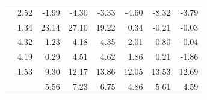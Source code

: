 \begin{table}[H]
\begin{tabular}{ld{1.2}:d{3.2}d{3.2}d{3.2}:d{3.2}d{3.2}d{3.2}}
              & 2.52 & -1.99 & -4.30 & -3.33 & -4.60     & -8.32        & -3.79       \\
              & 1.34 & 23.14 & 27.10 & 19.22 & 0.34      & -0.21        & -0.03       \\
   & 4.32 & 1.23  & 4.18  & 4.35  & 2.01      & 0.80         & -0.04       \\
   & 4.19 & 0.29  & 4.51  & 4.62  & 1.86      & 0.21         & -1.86       \\
              & 1.53 & 9.30  & 12.17 & 13.86 & 12.05     & 13.53        & 12.69       \\ \hline
              &      & 5.56  & 7.23  & 6.75  & 4.86      & 5.61         & 4.59        \\ \hline
  \end{tabular}

  \raggedright
  \par{} 
  \par{} 
\end{table}

\newpage

